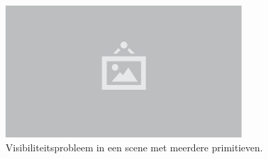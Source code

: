 \begin{figure}
  \centering
  \includegraphics[width=0.8\textwidth]{./img/raw/placeholder.png}
  \caption{Visibiliteitsprobleem in een scene met meerdere primitieven.}
  \label{fig:vp-visibiliteit}
\end{figure}
